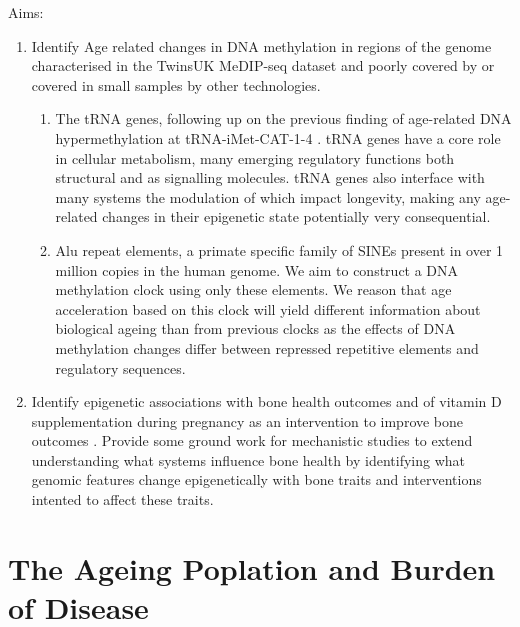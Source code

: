 \documentclass[
]{book}
\providecommand{\tightlist}{%
  \setlength{\itemsep}{0pt}\setlength{\parskip}{0pt}}
\begin{document}
Aims:

\begin{enumerate}
\def\labelenumi{\arabic{enumi}.}
\item
  Identify Age related changes in DNA methylation in regions of the genome characterised in the TwinsUK MeDIP-seq dataset and poorly covered by or covered in small samples by other technologies.

  \begin{enumerate}
  \def\labelenumii{\alph{enumii}.}
  \tightlist
  \item
    The tRNA genes, following up on the previous finding of age-related DNA hypermethylation at tRNA-iMet-CAT-1-4 \citep{Bell2016}. tRNA genes have a core role in cellular metabolism, many emerging regulatory functions both structural and as signalling molecules. tRNA genes also interface with many systems the modulation of which impact longevity, making any age-related changes in their epigenetic state potentially very consequential.
  \item
    Alu repeat elements, a primate specific family of SINEs present in over 1 million copies in the human genome. We aim to construct a DNA methylation clock using only these elements. We reason that age acceleration based on this clock will yield different information about biological ageing than from previous clocks as the effects of DNA methylation changes differ between repressed repetitive elements and regulatory sequences.
  \end{enumerate}
\item
  Identify epigenetic associations with bone health outcomes and of vitamin D supplementation during pregnancy as an intervention to improve bone outcomes \citep{Harvey2012a, Cooper2016}. Provide some ground work for mechanistic studies to extend understanding what systems influence bone health by identifying what genomic features change epigenetically with bone traits and interventions intented to affect these traits.
\end{enumerate}

\hypertarget{the-ageing-poplation-and-burden-of-disease}{%
\chapter{The Ageing Poplation and Burden of Disease}\label{the-ageing-poplation-and-burden-of-disease}}
\end{document}

